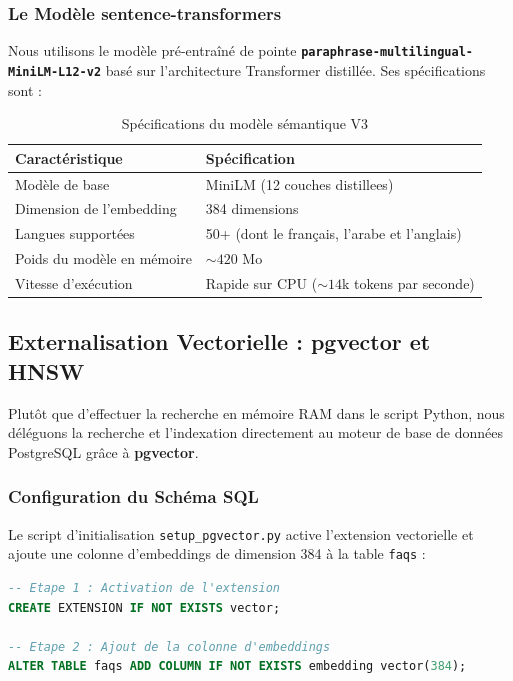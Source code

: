 \documentclass[11pt,a4paper]{article}
\begin{document}
\subsubsection{Le Modèle sentence-transformers}
Nous utilisons le modèle pré-entraîné de pointe \textbf{\texttt{paraphrase-multilingual-MiniLM-L12-v2}} basé sur l'architecture Transformer distillée. Ses spécifications sont :
\begin{table}[H]
\centering
\begin{tabular}{ll}
\toprule
\textbf{Caractéristique} & \textbf{Spécification} \\
\midrule
Modèle de base & MiniLM (12 couches distillees) \\
Dimension de l'embedding & 384 dimensions \\
Langues supportées & 50+ (dont le français, l'arabe et l'anglais) \\
Poids du modèle en mémoire & $\sim 420$ Mo \\
Vitesse d'exécution & Rapide sur CPU ($\sim 14$k tokens par seconde) \\
\bottomrule
\end{tabular}
\caption{Spécifications du modèle sémantique V3}
\end{table}

\subsection{Externalisation Vectorielle : pgvector et HNSW}
Plutôt que d'effectuer la recherche en mémoire RAM dans le script Python, nous déléguons la recherche et l'indexation directement au moteur de base de données PostgreSQL grâce à \textbf{pgvector}.

\subsubsection{Configuration du Schéma SQL}
Le script d'initialisation \texttt{setup\_pgvector.py} active l'extension vectorielle et ajoute une colonne d'embeddings de dimension 384 à la table \texttt{faqs} :
\begin{lstlisting}[language=SQL, caption=Modification du schéma SQL pour pgvector]
-- Etape 1 : Activation de l'extension
CREATE EXTENSION IF NOT EXISTS vector;

-- Etape 2 : Ajout de la colonne d'embeddings
ALTER TABLE faqs ADD COLUMN IF NOT EXISTS embedding vector(384);
\end{lstlisting}
\end{document}
